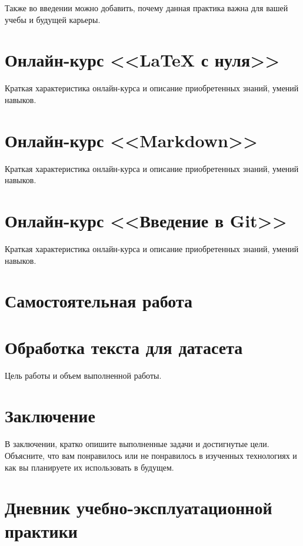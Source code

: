 \documentclass[12pt]{article}
\begin{document}
Также во введении можно добавить, почему данная практика важна для вашей учебы и будущей карьеры.


\section{Онлайн-курс <<LaTeX с нуля>>}

Краткая характеристика онлайн-курса и описание приобретенных знаний, умений навыков.


\section{Онлайн-курс <<Markdown>>}

Краткая характеристика онлайн-курса и описание приобретенных знаний, умений навыков.


\section{Онлайн-курс <<Введение в Git>>}

Краткая характеристика онлайн-курса и описание приобретенных знаний, умений навыков.


\section{Самостоятельная работа}



\section{Обработка текста для датасета}

Цель работы и объем выполненной работы.


\section*{Заключение}

В заключении, кратко опишите выполненные задачи и достигнутые цели. Объясните, что вам понравилось или не понравилось в изученных технологиях и как вы планируете их использовать в будущем.


\newpage \section*{Дневник учебно-эксплуатационной практики}
\end{document}
